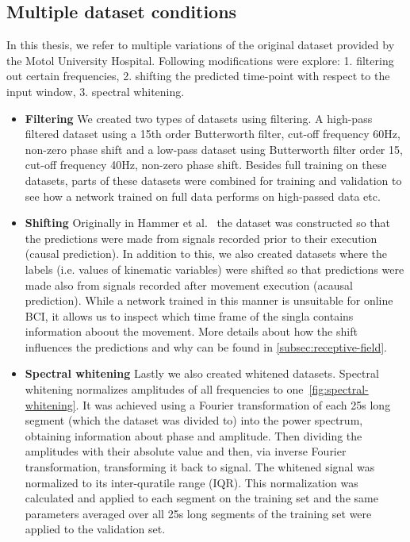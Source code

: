 \subsection{Multiple dataset conditions}\label{subsec:modifications-to-the-dataset}
In this thesis, we refer to multiple variations of the original dataset provided by the Motol University Hospital.
Following modifications were explore: 1. filtering out certain frequencies, 2. shifting the predicted time-point with respect to the input window, 3. spectral whitening.
\begin{itemize}
\item \textbf{Filtering} We created two types of datasets using filtering.
A high-pass filtered dataset using a 15th order Butterworth filter, cut-off frequency 60Hz, non-zero phase shift and a low-pass dataset using Butterworth filter order 15, cut-off frequency 40Hz, non-zero phase shift. Besides full training on these datasets, parts of these datasets were combined for training and validation to see how a network trained on full data performs on high-passed data etc.
\\

\item \textbf{Shifting} Originally in Hammer et al.~\cite{Hammer-2021} the dataset was constructed so that the predictions were made from signals recorded prior to their execution (causal prediction).
In addition to this, we also created datasets where the labels (i.e. values of kinematic variables) were shifted so that predictions were made also from signals recorded after movement execution (acausal prediction).
While a network trained in this manner is unsuitable for online BCI, it allows us to inspect which time frame of the singla contains information aboout the movement.
More details about how the shift influences the predictions and why can be found in \ref{subsec:receptive-field}. \\

\item \textbf{Spectral whitening} Lastly we also created whitened datasets.
Spectral whitening normalizes amplitudes of all frequencies to one~\ref{fig:spectral-whitening}.
It was achieved using a Fourier transformation of each 25s long segment (which the dataset was divided to) into the power spectrum, obtaining information about phase and amplitude.
Then dividing the amplitudes with their absolute value and then, via inverse Fourier transformation, transforming it back to signal.
The whitened signal was normalized to its inter-quratile range (IQR).
This normalization was calculated and applied to each segment on the training set and the same parameters averaged over all 25s long segments of the training set were applied to the validation set.


\end{itemize}
